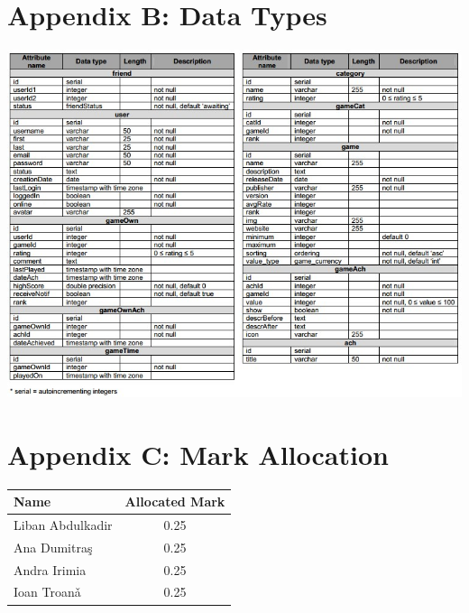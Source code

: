 \documentclass{article}
\begin{document}
\chapter{\textbf{Appendix B: Data Types}}
\begin{center}
\includegraphics[width=0.87\columnwidth]{types} %
\end{center}

\chapter{\textbf{Appendix C: Mark Allocation}}
\begin{flushleft}
    \begin{tabular}{| l | c |}
    \hline
    \textbf{Name} & \textbf{Allocated Mark}\\ \hline
    Liban Abdulkadir & 0.25\\ \hline
    Ana Dumitra\c{s} & 0.25 \\ \hline
    Andra Irimia & 0.25 \\ \hline
    Ioan Troan\v{a} & 0.25 \\ \hline
    \end{tabular}
\end{flushleft}
\end{document}
